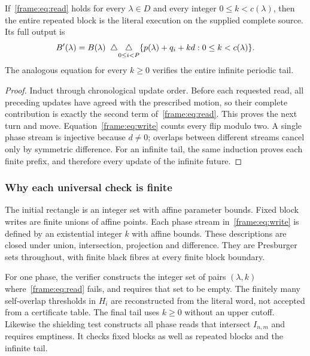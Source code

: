 \begin{lemma}\label{frame:lem:repeat}
If~\eqref{frame:eq:read} holds for every $\lambda\in D$ and every integer $0\le k<c(\lambda)$, then the entire repeated block is the literal execution on the supplied complete source. Its full output is
\begin{equation}\label{frame:eq:write}
 B'(\lambda)=B(\lambda)\ \mathbin{\triangle}\!
 \mathop{\triangle}_{0\le i<P}\{p(\lambda)+q_i+kd:0\le k<c(\lambda)\}.
\end{equation}
The analogous equation for every $k\ge0$ verifies the entire infinite periodic tail.
\end{lemma}
\begin{proof}
Induct through chronological update order. Before each requested read, all preceding updates have agreed with the prescribed motion, so their complete contribution is exactly the second term of~\eqref{frame:eq:read}. This proves the next turn and move. Equation~\eqref{frame:eq:write} counts every flip modulo two. A single phase stream is injective because $d\ne0$; overlaps between different streams cancel only by symmetric difference. For an infinite tail, the same induction proves each finite prefix, and therefore every update of the infinite future.
\end{proof}

\subsubsection{Why each universal check is finite}
The initial rectangle is an integer set with affine parameter bounds. Fixed block writes are finite unions of affine points. Each phase stream in~\eqref{frame:eq:write} is defined by an existential integer $k$ with affine bounds. These descriptions are closed under union, intersection, projection and difference. They are Presburger sets throughout, with finite black fibres at every finite block boundary.

For one phase, the verifier constructs the integer set of pairs $(\lambda,k)$ where~\eqref{frame:eq:read} fails, and requires that set to be empty. The finitely many self-overlap thresholds in $H_i$ are reconstructed from the literal word, not accepted from a certificate table. The final tail uses $k\ge0$ without an upper cutoff. Likewise the shielding test constructs all phase reads that intersect $I_{n,m}$ and requires emptiness. It checks fixed blocks as well as repeated blocks and the infinite tail.

